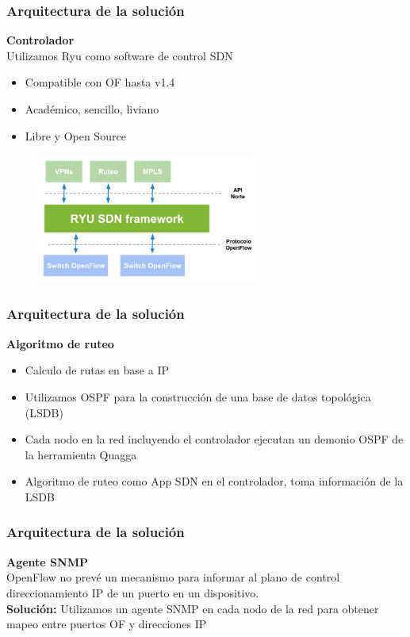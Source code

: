 \documentclass{beamer}
\begin{document}
\begin{frame}
\frametitle{Arquitectura de la soluci\'on} 

\textbf{Controlador} \\
Utilizamos Ryu como software de control SDN

\begin{itemize}
\item Compatible con OF hasta v1.4
\item Acad\'emico, sencillo, liviano
\item Libre y Open Source
\end{itemize}

\begin{figure}[H]
\centering
\includegraphics[width=0.65\textwidth]{imagenes/ryuarch.png}
\end{figure}

\end{frame}

\begin{frame}
\frametitle{Arquitectura de la soluci\'on} 

\textbf{Algoritmo de ruteo} \\
\begin{itemize}
\item Calculo de rutas en base a IP
\item Utilizamos OSPF para la construcci\'on de una base de datos topol\'ogica (LSDB)
\item Cada nodo en la red incluyendo el controlador ejecutan un demonio OSPF de la herramienta Quagga
\item Algoritmo de ruteo como App SDN en el controlador, toma informaci\'on de la LSDB
\end{itemize}

\end{frame}

\begin{frame}
\frametitle{Arquitectura de la soluci\'on} 

\textbf{Agente SNMP} \\
OpenFlow no prev\'e un mecanismo para informar al plano de control direccionamiento IP de un puerto en un dispositivo. \\

\vspace{0.5cm}
\textbf{Soluci\'on:}  Utilizamos un agente SNMP en cada nodo de la red para obtener mapeo entre puertos OF y direcciones IP

\end{frame}
\end{document}
